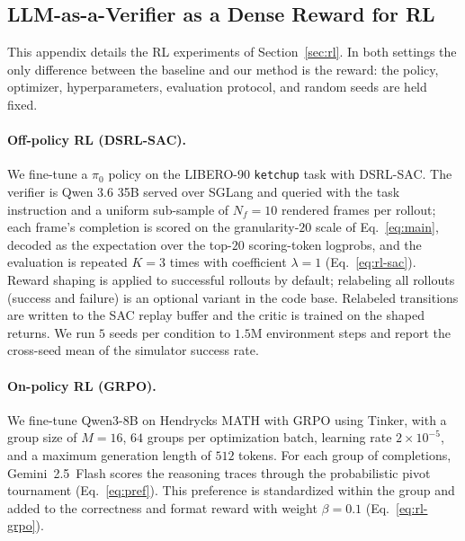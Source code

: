 \subsection{LLM-as-a-Verifier as a Dense Reward for RL}
\label{app:rl}

This appendix details the RL experiments of Section~\ref{sec:rl}. In both settings the only difference between the baseline and our method is the reward: the policy, optimizer, hyperparameters, evaluation protocol, and random seeds are held fixed.

\paragraph{Off-policy RL (DSRL-SAC).} We fine-tune a $\pi_0$ policy on the LIBERO-90 \texttt{ketchup} task with DSRL-SAC. The verifier is Qwen 3.6 35B served over SGLang and queried with the task instruction and a uniform sub-sample of $N_f{=}10$ rendered frames per rollout; each frame's completion is scored on the granularity-$20$ scale of Eq.~\ref{eq:main}, decoded as the expectation over the top-$20$ scoring-token logprobs, and the evaluation is repeated $K=3$ times with coefficient $\lambda{=}1$ (Eq.~\ref{eq:rl-sac}). Reward shaping is applied to successful rollouts by default; relabeling all rollouts (success and failure) is an optional variant in the code base. Relabeled transitions are written to the SAC replay buffer and the critic is trained on the shaped returns. We run $5$ seeds per condition to $1.5\mathrm{M}$ environment steps and report the cross-seed mean of the simulator success rate.

\paragraph{On-policy RL (GRPO).} We fine-tune Qwen3-8B on Hendrycks MATH with GRPO using Tinker, with a group size of $M{=}16$, $64$ groups per optimization batch, learning rate $2\times10^{-5}$, and a maximum generation length of $512$ tokens. For each group of completions, Gemini~2.5~Flash scores the reasoning traces through the probabilistic pivot tournament (Eq.~\ref{eq:pref}). This preference is standardized within the group and added to the correctness and format reward with weight $\beta=0.1$ (Eq.~\ref{eq:rl-grpo}).
